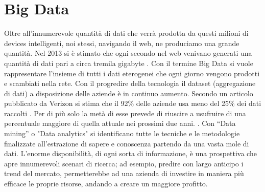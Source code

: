 \section{Big Data}
Oltre all'innumerevole quantità di dati che verrà prodotta da questi milioni di
devices intelligenti, noi stessi,  navigando il web, ne produciamo una grande
quantità. Nel 2013 si è stimato che ogni secondo nel web venivano generati una
quantità di dati pari a circa tremila gigabyte . Con il termine Big Data si vuole
rappresentare l'insieme di tutti i dati eterogenei che ogni giorno vengono
prodotti e scambiati nella rete.
Con il progredire della tecnologia il dataset (aggregazione di dati) a
disposizione delle aziende è in continuo aumento.
Secondo un articolo pubblicato da Verizon si stima che il 92\% delle aziende
usa meno del 25\% dei dati raccolti \cite{VerizionIoT}. Per di più  solo la metà
di esse prevede di riuscire a usufruire di una percentuale maggiore di quella attuale
nei prossimi due anni.
\cite{VerizionIoT}.  Con “Data mining” o "Data analytics"  si identificano tutte le
tecniche e le metodologie finalizzate all’estrazione di sapere e conoscenza
partendo da una vasta mole di dati.
L’enorme disponibilità, di ogni sorta di informazione, è una prospettiva che 
apre innumerevoli scenari di ricerca; ad esempio, predire con largo anticipo i 
trend del mercato, permetterebbe ad una azienda di investire in maniera più
efficace le proprie risorse, andando a creare un maggiore profitto.


